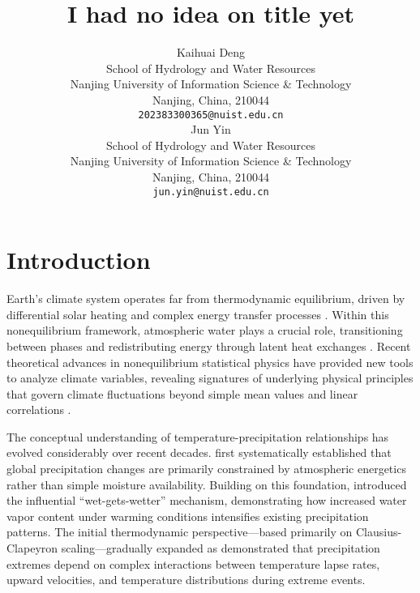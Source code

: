 \documentclass{article}
\title{I had no idea on title yet}
\author{
 Kaihuai Deng \\
  School of Hydrology and Water Resources\\
  Nanjing University of Information Science \& Technology\\
  Nanjing, China, 210044 \\
  \texttt{202383300365@nuist.edu.cn} \\
   \And
 Jun Yin \\
  School of Hydrology and Water Resources\\
  Nanjing University of Information Science \& Technology\\
  Nanjing, China, 210044 \\
  \texttt{jun.yin@nuist.edu.cn} \\
}
\begin{document}
\maketitle
\begin{abstract}


\end{abstract}




\section{Introduction}\label{introduction}


Earth's climate system operates far from thermodynamic equilibrium,
driven by differential solar heating and complex energy transfer
processes \cite{kleidon2016thermodynamic}. Within this nonequilibrium
framework, atmospheric water plays a crucial role, transitioning between
phases and redistributing energy through latent heat exchanges
\cite{marconi_fluctuationdissipation_2008}. 
Recent theoretical advances
in nonequilibrium statistical physics have provided new tools to analyze
climate variables, revealing signatures of underlying physical
principles that govern climate fluctuations beyond simple mean values
and linear correlations \cite{yin_nonequilibrium_2024}.

The conceptual understanding of temperature-precipitation relationships
has evolved considerably over recent decades. \citeauthor{allen2002constraints}
first systematically established that global precipitation changes are
primarily constrained by atmospheric energetics rather than simple
moisture availability. Building on this foundation, \citeauthor{held2006robust}
introduced the influential ``wet-gets-wetter'' mechanism, demonstrating
how increased water vapor content under warming conditions intensifies
existing precipitation patterns. The initial thermodynamic
perspective---based primarily on Clausius-Clapeyron scaling---gradually
expanded as \citeauthor{o2009physical} demonstrated that precipitation extremes
depend on complex interactions between temperature lapse rates, upward
velocities, and temperature distributions during extreme events.
\end{document}
